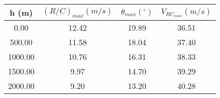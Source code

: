 \begin{tabular}{|cccc|} \hline 
h (m) & $(R/C)_{max} (m/s)$ & $\theta_{max} (^\circ)$ & $V_{RC_{max}} (m/s)$  \\ \hline 
    0.00 &    12.42 &    19.89 &    36.51 \\ 
  500.00 &    11.58 &    18.04 &    37.40 \\ 
 1000.00 &    10.76 &    16.31 &    38.33 \\ 
 1500.00 &     9.97 &    14.70 &    39.29 \\ 
 2000.00 &     9.20 &    13.20 &    40.28 \\ \hline 
\end{tabular}
